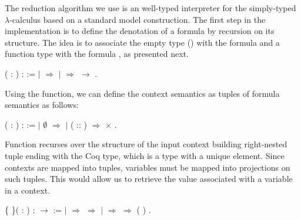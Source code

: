 The reduction algorithm we use is an well-typed interpreter for the simply-typed $\lambda$-calculus based on a
standard model construction. The first step in the implementation is to define the denotation of a formula by
recursion on its structure. The idea is to associate the empty type () with the formula  and a
function type with the formula   , as presented next.
 \begin{coqdoccode}
\coqdocemptyline
\coqdocemptyline
\coqdocnoindent
{}  ( : \coqdocvar{$\alpha$}) :  :=\coqdoceol
\coqdocindent{1.00em}
  \coqdoceol
\coqdocindent{1.00em}
\ensuremath{|}  \ensuremath{\Rightarrow} \coqdoceol
\coqdocindent{1.00em}
\ensuremath{|}    \ensuremath{\Rightarrow}   \ensuremath{\rightarrow}  \coqdoceol
\coqdocindent{1.00em}
.\coqdoceol
\coqdocemptyline
\end{coqdoccode}
Using the  function, we can define the context semantics as tuples
of formula semantics as follows:
 \begin{coqdoccode}
\coqdocemptyline
\coqdocnoindent
{}  ( : \coqdocvar{$\Gamma$}) :  :=\coqdoceol
\coqdocindent{1.00em}
  \coqdoceol
\coqdocindent{1.00em}
\ensuremath{|} $\emptyset$ \ensuremath{\Rightarrow} \coqdoceol
\coqdocindent{1.00em}
\ensuremath{|} ( :: ) \ensuremath{\Rightarrow}   \ensuremath{\times}  \coqdoceol
\coqdocindent{1.00em}
.\coqdoceol
\end{coqdoccode}
Function  recurses over the structure of the input context building
right-nested tuple ending with the Coq  type, which is a type with a
unique element. Since contexts are mapped into tuples, variables must be
mapped into projections on such tuples. This would allow us to retrieve the
value associated with a variable in a context.
\begin{coqdoccode}
\coqdocemptyline
\coqdocnoindent
{}  \{ \}( :   )\coqdoceol
\coqdocindent{1.00em}
:   \ensuremath{\rightarrow}   :=\coqdoceol
\coqdocindent{2.00em}
  \coqdoceol
\coqdocindent{2.00em}
\ensuremath{|}  \ensuremath{\Rightarrow}   \ensuremath{\Rightarrow}  \coqdoceol
\coqdocindent{2.00em}
\ensuremath{|}   \ensuremath{\Rightarrow}   \ensuremath{\Rightarrow}   ( )\coqdoceol
\coqdocindent{2.00em}
.\coqdoceol
\coqdocemptyline
\end{coqdoccode}
